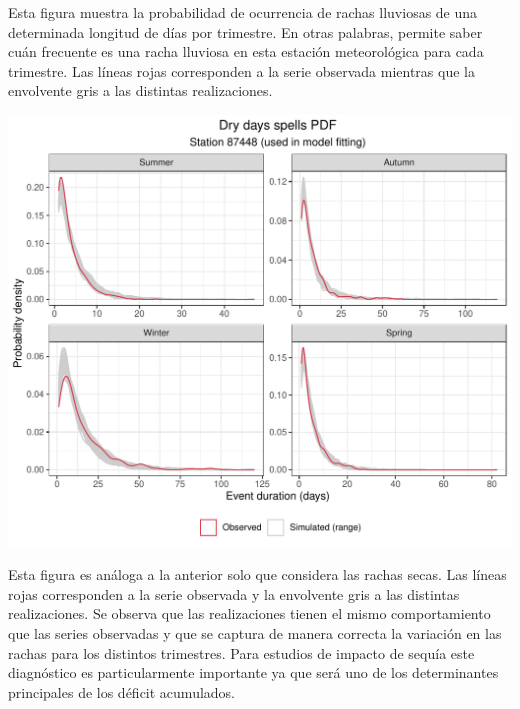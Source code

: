 \documentclass[
]{article}
\begin{document}
Esta figura muestra la probabilidad de ocurrencia de rachas lluviosas de una determinada longitud de días por trimestre. En otras palabras, permite saber cuán frecuente es una racha lluviosa en esta estación meteorológica para cada trimestre. Las líneas rojas corresponden a la serie observada mientras que la envolvente gris a las distintas realizaciones.

\begin{center}\includegraphics{Webinario_Generador_files/figure-latex/unnamed-chunk-32-1} \end{center}

Esta figura es análoga a la anterior solo que considera las rachas secas. Las líneas rojas corresponden a la serie observada y la envolvente gris a las distintas realizaciones. Se observa que las realizaciones tienen el mismo comportamiento que las series observadas y que se captura de manera correcta la variación en las rachas para los distintos trimestres. Para estudios de impacto de sequía este diagnóstico es particularmente importante ya que será uno de los determinantes principales de los déficit acumulados.
\end{document}

